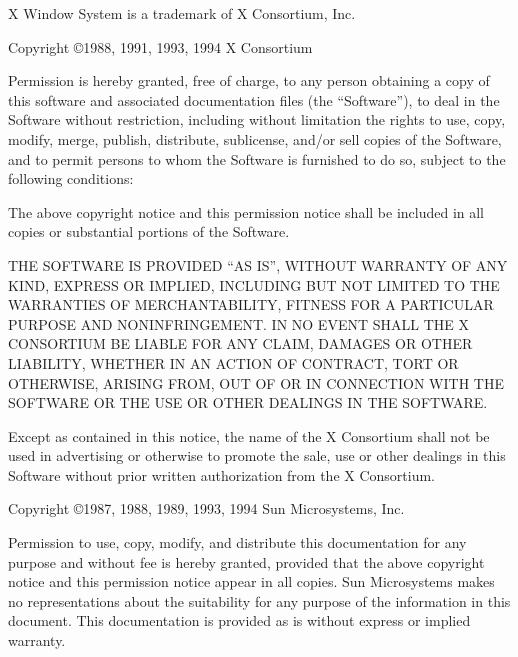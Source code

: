 \vspace*{\fill}

X Window System is a trademark of X Consortium, Inc.

Copyright \copyright 1988, 1991, 1993, 1994
X Consortium

Permission is hereby granted, free of charge, to any person obtaining
a copy of this software and associated documentation files (the
``Software''), to deal in the Software without restriction, including
without limitation the rights to use, copy, modify, merge, publish,
distribute, sublicense, and/or sell copies of the Software, and to
permit persons to whom the Software is furnished to do so, subject to
the following conditions:

The above copyright notice and this permission notice shall be included
in all copies or substantial portions of the Software.

THE SOFTWARE IS PROVIDED ``AS IS'', WITHOUT WARRANTY OF ANY KIND, EXPRESS
OR IMPLIED, INCLUDING BUT NOT LIMITED TO THE WARRANTIES OF
MERCHANTABILITY, FITNESS FOR A PARTICULAR PURPOSE AND NONINFRINGEMENT.
IN NO EVENT SHALL THE X CONSORTIUM BE LIABLE FOR ANY CLAIM, DAMAGES OR
OTHER LIABILITY, WHETHER IN AN ACTION OF CONTRACT, TORT OR OTHERWISE,
ARISING FROM, OUT OF OR IN CONNECTION WITH THE SOFTWARE OR THE USE OR
OTHER DEALINGS IN THE SOFTWARE.

Except as contained in this notice, the name of the X Consortium shall
not be used in advertising or otherwise to promote the sale, use or
other dealings in this Software without prior written authorization
from the X Consortium.

\vspace{2em}

Copyright \copyright 1987, 1988, 1989, 1993, 1994
Sun Microsystems, Inc.

Permission to use, copy, modify, and distribute this documentation 
for any purpose and without fee is hereby granted, provided 
that the above copyright notice and this permission 
notice appear in all copies.
Sun Microsystems makes no representations about the 
suitability for any purpose of the information in this document. 
This documentation is provided as is without express or implied warranty. 

\vspace*{\fill}
\clearpage
